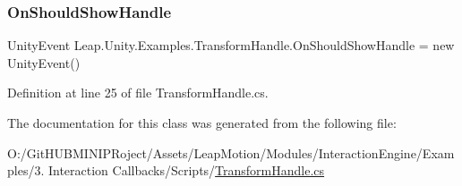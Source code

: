 \subsubsection{\texorpdfstring{OnShouldShowHandle}{OnShouldShowHandle}}
{\footnotesize\ttfamily Unity\+Event Leap.\+Unity.\+Examples.\+Transform\+Handle.\+On\+Should\+Show\+Handle = new Unity\+Event()}



Definition at line 25 of file Transform\+Handle.\+cs.



The documentation for this class was generated from the following file\+:\begin{DoxyCompactItemize}
\item 
O\+:/\+Git\+H\+U\+B\+M\+I\+N\+I\+P\+Roject/\+Assets/\+Leap\+Motion/\+Modules/\+Interaction\+Engine/\+Examples/3. Interaction Callbacks/\+Scripts/\mbox{\hyperlink{_transform_handle_8cs}{Transform\+Handle.\+cs}}\end{DoxyCompactItemize}
